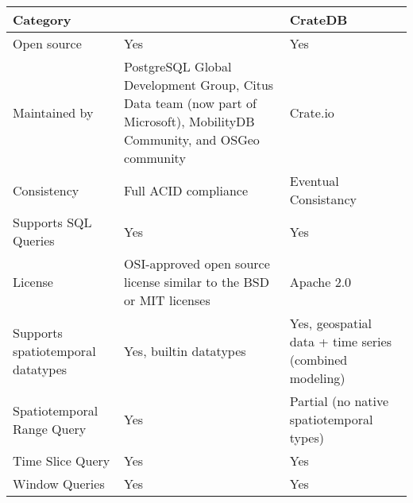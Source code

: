 \begin{table}[h]
	\centering
	\begin{tabular}{|P{3.3cm}|P{6cm}|P{4cm}|}
		\hline
		Category                          & \mobilitydbc~                                                       & CrateDB                                                \\
		\hline
		Open source                       & Yes                                                                 & Yes                                                    \\
		\hline
		Maintained by                     &
		PostgreSQL Global Development Group,
		Citus Data team (now part of Microsoft),
		MobilityDB Community, and OSGeo community
		                                  & Crate.io                                                                                                                     \\
		\hline
		Consistency                       & Full ACID compliance                                                & Eventual Consistancy                                   \\
		\hline
		Supports SQL Queries              & Yes                                                                 & Yes                                                    \\
		\hline
		License                           & OSI-approved open source license similar to the BSD or MIT licenses & Apache 2.0                                             \\
		\hline
		Supports spatiotemporal datatypes & Yes, builtin datatypes                                              & Yes, geospatial data + time series (combined modeling) \\
		\hline
		Spatiotemporal Range Query        & Yes                                                                 & Partial (no native spatiotemporal types)               \\
		\hline
		Time Slice Query                  & Yes                                                                 & Yes                                                    \\
		\hline
		Window Queries                    & Yes                                                                 & Yes                                                    \\

\end{tabular}
\end{table}

